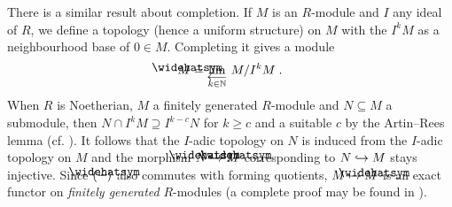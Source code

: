 \documentclass[a4paper,parskip=half,numbers=enddot, DIV=12]{scrreprt}
\begin{document}
There is a similar result about completion. If $M$ is an $R$-module and $I$ any ideal of $R$, we define a topology (hence a uniform structure) on $M$ with the $I^kM$ as a neighbourhood base of $0\in M$. Completing it gives a module 
\begin{align*}
	\roof{M}=\limit[k\in\IN] M/I^kM\;. 
\end{align*}
When $R$ is Noetherian, $M$ a finitely generated $R$-module and $N\subseteq M$ a submodule, then $N\cap I^kM\supseteq I^{k-c}N$ for $k\geq c$ and a suitable $c$ by the Artin--Rees lemma (cf. \cite[Proposition~3.4.1]{alg2}). It follows that the $I$-adic topology on $N$ is induced from the $I$-adic topology on $M$ and the morphism $\roof{N}\morphism\roof{M}$ corresponding to $N\monomorphism M$ stays injective. Since $\roof{(-)}$ also commutes with forming quotients, $M\mapsto\roof{M}$ is an exact functor on \emph{finitely generated} $R$-modules (a complete proof may be found in \cite[Lemma~7.15]{eisenbudCommAlg}). 
\end{document}
